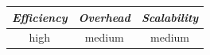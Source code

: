 %
%

%
%

\begin{center}
\begin{tabular}{ccc}
\emph{Efficiency} & \emph{Overhead} & \emph{Scalability} \\
\hline
high &
medium &
medium
\end{tabular}
\end{center}

